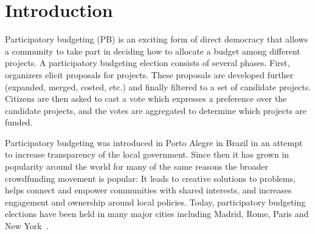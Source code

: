 \documentclass[mnsc,blindrev]{informs3_freeuse} %
\begin{document}
 


\maketitle




\section{Introduction}\label{sec:intro}

Participatory budgeting (PB) is an exciting form of direct democracy that allows a community to take part in deciding how to allocate a budget among different projects.  
A participatory budgeting election  consists of several phases. First, organizers elicit proposals for  projects. These proposals are developed further (expanded, merged, costed, etc.) and finally filtered to a set of candidate projects.  Citizens are then asked to cast a vote which expresses a preference over the candidate projects, and the votes are aggregated to determine which projects are funded.
%

Participatory budgeting was introduced in Porto Alegre in Brazil in an attempt to increase transparency of the local government. Since then it has grown in  popularity around the world for many of the same reasons the broader crowdfunding movement is popular: It leads to creative solutions to   problems, helps connect and empower communities with shared interests,  and increases engagement and ownership around local policies.
Today, participatory budgeting elections have been held in many major cities including Madrid, Rome, Paris and New York~\citep{sintomer2008participatory,su2017porto}.  %
\end{document}
